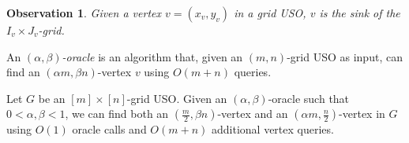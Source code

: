 \documentclass[runningheads,a4paper]{llncs}
\newtheorem{observation}{Observation}
\begin{document}
\begin{observation}\label{Obs:Sink of dominated grid}
Given a vertex  $v = (x_v, y_v)$ in a grid USO, $v$ is the sink of the $I_v\times J_v$-grid.
\end{observation}

An \emph{$(\alpha, \beta)$-oracle} is an algorithm that, given an $(m, n)$-grid USO as input, can find an $(\alpha m, \beta n)$-vertex $v$ using $O(m + n)$ queries.

\begin{lemma}\label{lemma:Climbing lemma}
Let $G$ be an $[m]\times [n]$-grid USO.
Given an $(\alpha, \beta)$-oracle such that $0 < \alpha, \beta  < 1$, we can find both an $(\frac{m}{2}, \beta n)$-vertex and an $(\alpha m, \frac{n}{2})$-vertex in $G$ using $O(1)$ oracle calls and $O(m+n)$ additional vertex queries.
\end{lemma}
\end{document}
